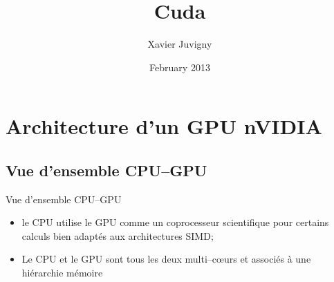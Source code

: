 \documentclass{beamer}
\title{Cuda}
\author[Juvigny]{Xavier Juvigny}
\institute{ONERA/CHP}
\date[C2013]{February 2013}
\begin{document}
\frame[plain]{\maketitle}

\section{Architecture d'un GPU nVIDIA}

\subsection{Vue d'ensemble CPU--GPU}

\begin{frame}{Vue d'ensemble CPU--GPU}

\begin{itemize}
\item le CPU utilise le GPU comme un coprocesseur scientifique pour certains
  calculs bien adaptés aux architectures SIMD;
\item Le CPU et le GPU sont tous les deux multi--c{\oe}urs et associés à une
  hiérarchie mémoire
\end{itemize}


\end{frame}
\end{document}

